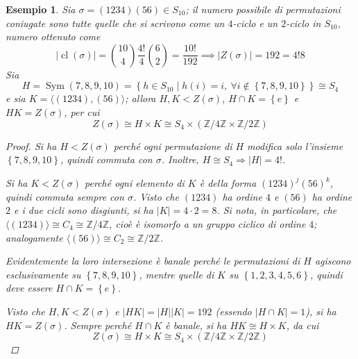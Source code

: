 \documentclass[11pt]{scrartcl}
\theoremstyle{style1}
\newtheorem{esempio}{Esempio}[section]
\numberwithin{equation}{subsection}
\begin{document}
\begin{esempio}
Sia $\sigma = (1234)(56) \in S_{10}$; il numero possibile di permutazioni coniugate sono tutte quelle che si scrivono come un $4$-ciclo e un $2$-ciclo in $S_{10}$, numero ottenuto come
\[
	\lvert \operatorname{cl} (\sigma ) \rvert  = \binom{10}{4}\frac{4!}{4} \binom{6}{2}= \frac{10!}{192}\implies \lvert Z(\sigma ) \rvert = 192 = 4! 8
\] 
Sia
\[
H = \operatorname{Sym} \left(7,8,9,10\right) =\left\{ h \in S_{10}  \mid h(i) = i, \ \forall i \not \in \left\{ 7,8,9,10 \right\}  \right\} \cong S_4
\] 
e sia $K = \langle (1234),(56) \rangle$; allora $H,K < Z(\sigma )$, $H\cap K = \left\{ e \right\} $ e $HK=Z(\sigma )$, per cui
\[
Z(\sigma ) \cong H \times K \cong S_4 \times (\mathbb{Z}/4\mathbb{Z} \times \mathbb{Z}/2\mathbb{Z})
\] 
\begin{proof}
	Si ha $H <Z(\sigma )$ perch\'e ogni permutazione di $H$ modifica solo l'insieme $\left\{ 7,8,9,10 \right\} $, quindi commuta con $\sigma $. Inoltre, $H \cong S_4 \Rightarrow \lvert H \rvert  = 4!$.

	Si ha $K<Z(\sigma )$ perch\'e ogni elemento di $K$ \`e della forma $(1234)^j(56)^k$, quindi commuta sempre con $\sigma $.
	Visto che $(1234)$ ha ordine $4$ e $(56)$ ha ordine $2$ e i due cicli sono disgiunti, si ha $\lvert K \rvert = 4 \cdot 2=8$.
	Si nota, in particolare, che $\langle (1234) \rangle\cong C_4\cong\mathbb{Z}/4\mathbb{Z}$, cio\`e \`e isomorfo a un gruppo ciclico di ordine $4$; analogamente $\langle (56) \rangle\cong C_2\cong\mathbb{Z}/2\mathbb{Z}$.

	Evidentemente la loro intersezione \`e banale perch\'e le permutazioni di $H$ agiscono esclusivamente su $\left\{ 7,8,9,10 \right\} $, mentre quelle di $K$ su $\left\{ 1,2,3,4,5,6 \right\} $, quindi deve essere $H\cap K = \left\{ e \right\} $.

	Visto che $H,K < Z(\sigma )$ e $\lvert HK \rvert = \lvert H \rvert \lvert K \rvert =192 $ (essendo $\lvert H\cap K \rvert = 1$), si ha $HK = Z(\sigma )$.
	Sempre perch\'e $H\cap K$ \`e banale, si ha $HK \cong H \times K$, da cui
	\[
	Z(\sigma ) \cong H \times K \cong S_4 \times (\mathbb{Z}/4\mathbb{Z} \times  \mathbb{Z}/2\mathbb{Z})
	\] 
\end{proof}
\end{esempio}
\end{document}
